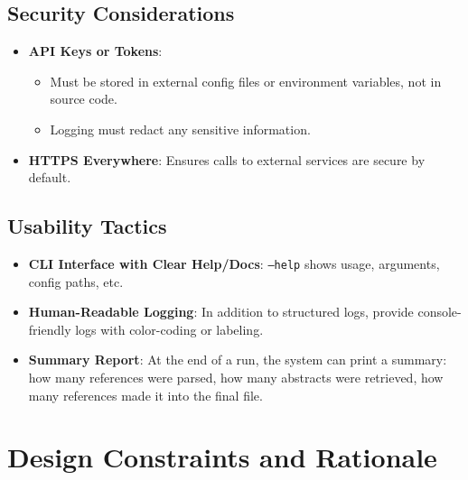 \documentclass[12pt]{article}
\begin{document}
\subsection{Security Considerations}
\begin{itemize}
  \item \textbf{API Keys or Tokens}: 
    \begin{itemize}
      \item Must be stored in external config files or environment variables, not in source code.
      \item Logging must redact any sensitive information.
    \end{itemize}
  \item \textbf{HTTPS Everywhere}: Ensures calls to external services are secure by default. 
\end{itemize}

\subsection{Usability Tactics}
\begin{itemize}
  \item \textbf{CLI Interface with Clear Help/Docs}: \texttt{--help} shows usage, arguments, config paths, etc.
  \item \textbf{Human-Readable Logging}: In addition to structured logs, provide console-friendly logs with color-coding or labeling.
  \item \textbf{Summary Report}: At the end of a run, the system can print a summary: how many references were parsed, how many abstracts were retrieved, how many references made it into the final file.
\end{itemize}

\section{Design Constraints and Rationale}
\end{document}
